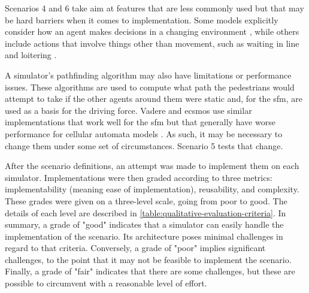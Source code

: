 \documentclass[twoside, 11pt]{article}
\begin{document}
Scenarios 4 and 6 take aim at features that are less commonly used but that may be hard barriers when it comes to implementation. Some models explicitly consider how an agent makes decisions in a changing environment \cite{DEIULIIS2023104527}, while others include actions that involve things other than movement, such as waiting in line and loitering \cite{KIM2013232, ALAM2022100527}. 

A simulator's pathfinding algorithm may also have limitations or performance issues. These algorithms are used to compute what path the pedestrians would attempt to take if the other agents around them were static and, for the \acrlong{sfm}, are used as a basis for the driving force. Vadere and \gls{ecsmos} use similar implementations that work well for the \gls{sfm} but that generally have worse performance for cellular automata models \cite{kleinmeierVadereOpenSourceSimulation2019}. As such, it may be necessary to change them under some set of circumstances. Scenario 5 tests that change.

After the scenario definitions, an attempt was made to implement them on each simulator. Implementations were then graded according to three metrics: implementability (meaning ease of implementation), reusability, and complexity. These grades were given on a three-level scale, going from poor to good. The details of each level are described in \autoref{table:qualitative-evaluation-criteria}. In summary, a grade of "good" indicates that a simulator can easily handle the implementation of the scenario. Its architecture poses minimal challenges in regard to that criteria. Conversely, a grade of "poor" implies significant challenges, to the point that it may not be feasible to implement the scenario. Finally, a grade of "fair" indicates that there are some challenges, but these are possible to circumvent with a reasonable level of effort.
\end{document}
